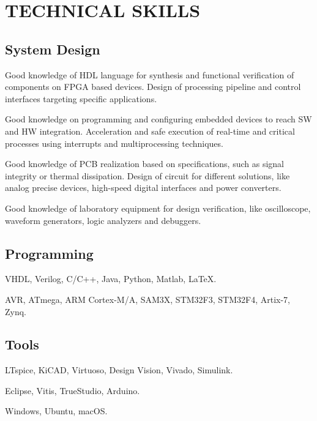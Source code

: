 \section{TECHNICAL SKILLS}
\subsection{System Design}
\begin{description}[leftmargin=5mm]
    \item[-] Good knowledge of HDL language for synthesis and functional verification of components on FPGA based devices. Design of processing pipeline and control interfaces targeting specific applications.
    \item[-] Good knowledge on programming and configuring embedded devices to reach SW and HW integration. Acceleration and safe execution of real-time and critical processes using interrupts and multiprocessing techniques.
    \item[-] Good knowledge of PCB realization based on specifications, such as signal integrity or thermal dissipation. Design of circuit for different solutions, like analog precise devices, high-speed digital interfaces and power converters.
    \item[-] Good knowledge of laboratory equipment for design verification, like oscilloscope, waveform generators, logic analyzers and debuggers.
\end{description}
\subsection{Programming}
\begin{description}[leftmargin=5mm]
    \item[- Languages:] VHDL, Verilog, C/C++, Java, Python, Matlab, \LaTeX.
    \item[- Architectures:] AVR, ATmega, ARM Cortex-M/A, SAM3X, STM32F3, STM32F4, Artix-7, Zynq.
\end{description}

\subsection{Tools}
\begin{description}[leftmargin=5mm]
    \item[- CAD:] LTspice, KiCAD, Virtuoso, Design Vision, Vivado, Simulink.
    \item[- IDE:] Eclipse, Vitis, TrueStudio, Arduino.
    \item[- OS:] Windows, Ubuntu, macOS.
\end{description}